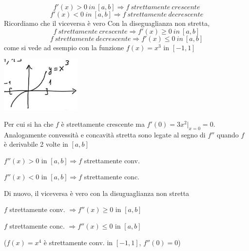 \documentclass[12pt]{article}
\begin{document}
\begin{equation*}
    f'(x)>0 \ in \ [a,b] \Rightarrow f \ strettamente \ crescente
\end{equation*}
\begin{equation*}
    f'(x)<0 \ in \ [a,b] \Rightarrow f \ strettamente \ decrescente
\end{equation*}
Ricordiamo che il viceversa è vero
Con la diseguaglianza non stretta,
\begin{equation*}
    f \ strettamente \ crescente \Rightarrow f'(x)\geq0 \ in \ [a,b] 
\end{equation*}
\begin{equation*}
    f \ strettamente \ decrescente \Rightarrow f'(x)\leq0 \ in \ [a,b] 
\end{equation*}
come si vede ad esempio con la funzione $f(x)=x^3$ in $[-1,1]$
\begin{center}
            \includegraphics[width=0.3\textwidth]{5.jpg}\par
\end{center}
Per cui si ha che $f$ è strettamente crescente ma $f'(0)=3x^2|_{x=0}=0$.\\
\smallskip
Analogamente convessità e concavità stretta sono legate al segno di $f''$ quando $f$ è derivabile 2 volte in $[a,b]$\\
\begin{center}
    $f''(x) > 0 $ in $[a,b] \Rightarrow f$ strettamente conv.\\
\end{center}
\begin{center}
    $f''(x) < 0 $ in $[a,b] \Rightarrow f$ strettamente conc.\\
\end{center}
Di nuovo, il viceversa è vero con la disuguaglianza non stretta
\begin{center}
    $f$ strettamente conv. $\Rightarrow f''(x) \geq 0 $ in $[a,b]$
\end{center}
\begin{center}
   $ f $ strettamente conc. $ \Rightarrow f''(x) \leq 0 $ in $[a,b]$
\end{center}
\begin{center}
    ($f(x) = x^4$ è  strettamente conv. in $[-1,1]$, $f''(0) = 0$)
\end{center}
\end{document}
